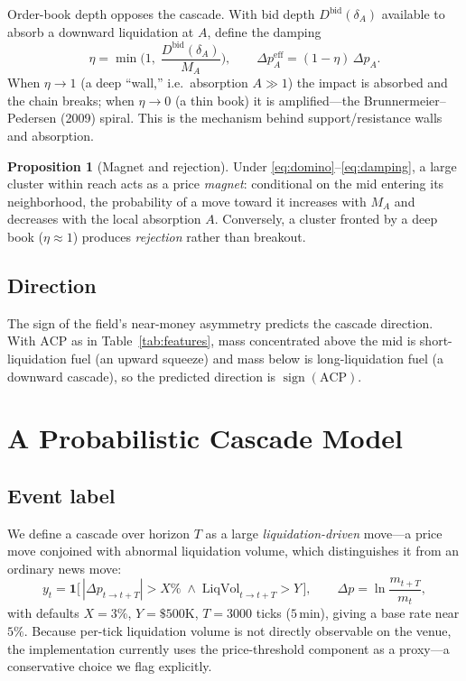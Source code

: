 \documentclass[11pt,a4paper]{article}
\theoremstyle{definition}
\newtheorem{proposition}{Proposition}[section]
\theoremstyle{plain}
\newcommand{\ind}{\mathbf{1}}
\newcommand{\sgn}{\operatorname{sign}}
\begin{document}
Order-book depth opposes the cascade. With bid depth $D^{\text{bid}}(\delta_A)$ available to absorb
a downward liquidation at $A$, define the damping
\begin{equation}
  \eta = \min\!\Big(1,\; \frac{D^{\text{bid}}(\delta_A)}{M_A}\Big),
  \qquad
  \Delta p_A^{\text{eff}} = (1-\eta)\,\Delta p_A.
  \label{eq:damping}
\end{equation}
When $\eta \to 1$ (a deep ``wall,'' i.e.\ absorption $A \gg 1$) the impact is absorbed and the chain
breaks; when $\eta \to 0$ (a thin book) it is amplified---the Brunnermeier--Pedersen (2009) spiral.
This is the mechanism behind support/resistance walls and absorption.

\begin{proposition}[Magnet and rejection]
\label{prop:magnet}
Under \eqref{eq:domino}--\eqref{eq:damping}, a large cluster within reach acts as a price
\emph{magnet}: conditional on the mid entering its neighborhood, the probability of a move toward
it increases with $M_A$ and decreases with the local absorption $A$. Conversely, a cluster fronted
by a deep book ($\eta\approx 1$) produces \emph{rejection} rather than breakout.
\end{proposition}

\subsection{Direction}

The sign of the field's near-money asymmetry predicts the cascade direction. With $\mathrm{ACP}$ as
in Table~\ref{tab:features}, mass concentrated above the mid is short-liquidation fuel (an upward
squeeze) and mass below is long-liquidation fuel (a downward cascade), so the predicted direction
is $\sgn(\mathrm{ACP})$.

\section{A Probabilistic Cascade Model}
\label{sec:probmodel}

\subsection{Event label}

We define a cascade over horizon $T$ as a large \emph{liquidation-driven} move---a price move
conjoined with abnormal liquidation volume, which distinguishes it from an ordinary news move:
\begin{equation}
  y_t = \ind\!\Big[\,|\Delta p_{t\to t+T}| > X\% \;\wedge\; \mathrm{LiqVol}_{t\to t+T} > Y\,\Big],
  \qquad \Delta p = \ln\frac{m_{t+T}}{m_t},
  \label{eq:label}
\end{equation}
with defaults $X = 3\%$, $Y = \$500\text{K}$, $T = 3000$ ticks ($5$\,min), giving a base rate near
$5\%$. Because per-tick liquidation volume is not directly observable on the venue, the
implementation currently uses the price-threshold component as a proxy---a conservative choice we
flag explicitly.
\end{document}
